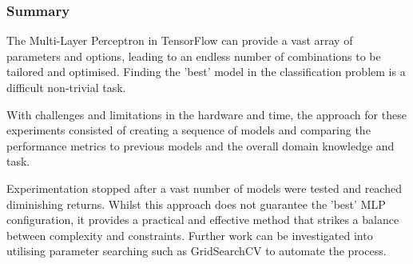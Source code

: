 \subsubsection*{Summary}

The Multi-Layer Perceptron in TensorFlow can provide a vast array of parameters and options, leading to an endless number of combinations to be tailored and optimised. Finding the 'best' model in the classification problem is a difficult non-trivial task. 

With challenges and limitations in the hardware and time, the approach for these experiments consisted of creating a sequence of models and comparing the performance metrics to previous models and the overall domain knowledge and task.

Experimentation stopped after a vast number of models were tested and reached diminishing returns. Whilst this approach does not guarantee the 'best' MLP configuration, it provides a practical and effective method that strikes a balance between complexity and constraints. Further work can be investigated into utilising parameter searching such as GridSearchCV to automate the process.
